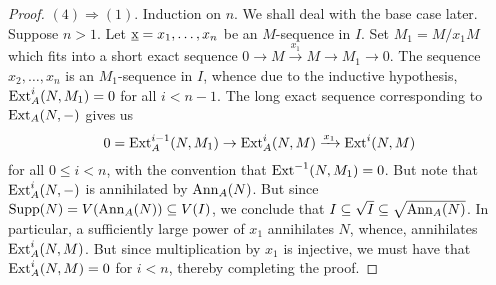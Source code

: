 \begin{proof}
    $(4)\Rightarrow(1)$. Induction on $n$. We shall deal with the base case later. Suppose $n > 1$. Let $\underbar{x} = x_1,\dots, x_n$ be an $M$-sequence in $I$. Set $M_1 = M/x_1 M$ which fits into a short exact sequence $0\to M\xrightarrow{x_1} M\to M_1\to 0$. The sequence $x_2,\dots,x_n$ is an $M_1$-sequence in $I$, whence due to the inductive hypothesis, $\operatorname{Ext}^i_A(N, M_1) = 0$ for all $i < n - 1$. The long exact sequence corresponding to $\operatorname{Ext}_A(N,-)$ gives us 
    \begin{equation*}
        0 = \operatorname{Ext}^{i - 1}_A(N, M_1)\to \operatorname{Ext}^i_A(N, M)\xrightarrow{x_1}\operatorname{Ext}^i(N, M)
    \end{equation*}
    for all $0\le i < n$, with the convention that $\operatorname{Ext}^{-1}(N, M_1) = 0$. But note that $\operatorname{Ext}^i_A(N,-)$ is annihilated by $\operatorname{Ann}_A(N)$. But since $\operatorname{Supp}(N) = V(\operatorname{Ann}_A(N))\subseteq V(I)$, we conclude that $I\subseteq\sqrt I\subseteq\sqrt{\operatorname{Ann}_A(N)}$. In particular, a sufficiently large power of $x_1$ annihilates $N$, whence, annihilates $\operatorname{Ext}^i_A(N, M)$. But since multiplication by $x_1$ is injective, we must have that $\operatorname{Ext}^i_A(N, M) = 0$ for $i < n$, thereby completing the proof.
\end{proof}

